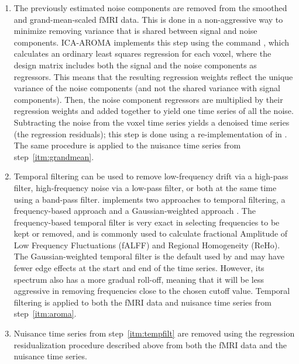 \begin{enumerate}[leftmargin=*]
\item\label{itm:aroma}

The previously estimated  noise components are removed from
the smoothed and grand-mean-scaled fMRI data. This is done in a
non-aggressive way to minimize removing variance that is shared between
signal and noise components. ICA-AROMA implements this step using the 
command , which calculates an ordinary least squares
regression for each voxel, where the design matrix includes both the signal
and the noise components as regressors. This means that the resulting
regression weights reflect the unique variance of the noise components (and
not the shared variance with signal components). Then, the noise component
regressors are multiplied by their regression weights and added together to
yield one time series of all the noise. Subtracting the noise from the
voxel time series yields a denoised time series (the regression residuals);
this step is done using a re-implementation of  in
 \parencite{10.1038/s41586-020-2649-2}. The same procedure is
applied to the nuisance time series from step~\ref{itm:grandmean}.

\item\label{itm:tempfilt}

Temporal filtering can be used to remove low-frequency drift via a
high-pass filter, high-frequency noise via a low-pass filter, or both at
the same time using a band-pass filter.  implements two
approaches to temporal filtering, a frequency-based approach
\parencite{10.1155/2013/935154} and a Gaussian-weighted approach
\parencite{10.1006/nimg.2000.0628}. The frequency-based temporal filter is very
exact in selecting frequencies to be kept or removed, and is commonly used
to calculate fractional Amplitude of Low Frequency Fluctuations (fALFF) and
Regional Homogeneity (ReHo). The Gaussian-weighted temporal filter is the
default used by  \parencite{10.1016/j.neuroimage.2011.09.015}
and may have fewer edge effects at the start and end of the time series.
However, its spectrum also has a more gradual roll-off, meaning that it
will be less aggressive in removing frequencies close to the chosen cutoff
value. Temporal filtering is applied to both the fMRI data and nuisance
time series from step~\ref{itm:aroma}.

\item

Nuisance time series from step~\ref{itm:tempfilt} are removed using the
regression residualization procedure described above from both the fMRI
data and the nuisance time series.

\end{enumerate}

